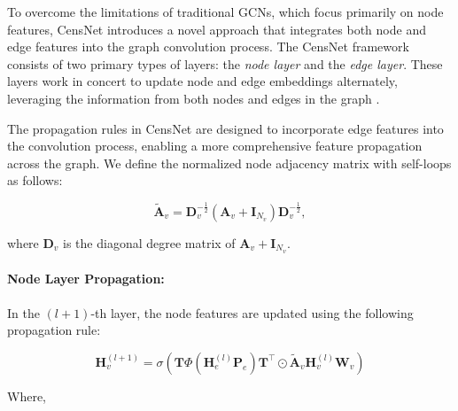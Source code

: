 To overcome the limitations of traditional GCNs, which focus primarily on node features, CensNet introduces a novel approach that integrates both node and edge features into the graph convolution process. The CensNet framework consists of two primary types of layers: the \textit{node layer} and the \textit{edge layer}. These layers work in concert to update node and edge embeddings alternately, leveraging the information from both nodes and edges in the graph \cite{9224195}.

The propagation rules in CensNet are designed to incorporate edge features into the convolution process, enabling a more comprehensive feature propagation across the graph. We define the normalized node adjacency matrix with self-loops as follows:

\begin{equation}
\tilde{\mathbf{A}}_v = \mathbf{D}_v^{-\frac{1}{2}} (\mathbf{A}_v + \mathbf{I}_{N_v}) \mathbf{D}_v^{-\frac{1}{2}},
    \label{eq:normalized_node_adjacency}
\end{equation}

where $\mathbf{D}_v$ is the diagonal degree matrix of $\mathbf{A}_v + \mathbf{I}_{N_v}$.

\paragraph{Node Layer Propagation:}


In the $(l+1)$-th layer, the node features are updated using the following propagation rule:


\begin{equation}
    \mathbf{H}^{(l+1)}_v = \sigma\left(\mathbf{T} \Phi\left(\mathbf{H}^{(l)}_e \mathbf{P}_e\right)\mathbf{T}^\top \odot \tilde{\mathbf{A}}_v \mathbf{H}^{(l)}_v \mathbf{W}_v\right) 
    \label{eq:CensNet_propagation}
\end{equation}

Where, 

